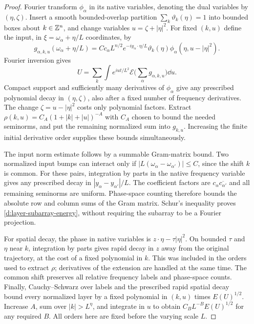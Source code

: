 \begin{proof}
Fourier transform $\phi_\alpha$ in its native variables, denoting the
dual variables by $(\eta,\zeta)$.  Insert a smooth bounded-overlap
partition $\sum_k\vartheta_k(\eta)=1$ into bounded boxes about
$k\in\mathbb Z^n$, and change variables $u=\zeta+|\eta|^2$.
For fixed $(k,u)$ define the input, in $\xi=\omega_\alpha+\eta/L$
coordinates, by
\[
 g_{\alpha,k,u}(\omega_\alpha+\eta/L)
   =C c_\alpha L^{n/2}e^{-iy_\alpha\cdot\eta/L}
       \vartheta_k(\eta)
       \widehat\phi_\alpha(\eta,u-|\eta|^2).
\]
Fourier inversion gives
\[
 U=\sum_k\int e^{iu t/L^2}
                     \mathcal E\Big(\sum_\alpha g_{\alpha,k,u}\Big)
                     \dd u.
\]
Compact support and sufficiently many derivatives of $\phi_\alpha$
give any prescribed polynomial decay in $(\eta,\zeta)$, also after a
fixed number of frequency derivatives.  The change
$\zeta=u-|\eta|^2$ costs only polynomial factors.  Extract
$\rho(k,u)=C_A(1+|k|+|u|)^{-A}$ with $C_A$ chosen to bound the needed
seminorms, and put the remaining normalized sum into $g_{k,u}$.
Increasing the finite initial derivative order supplies these bounds
simultaneously.

The input norm estimate follows by a summable Gram-matrix bound.
Two normalized input bumps can interact only if
$|L(\omega_\alpha-\omega_{\alpha'})|\le C$, since the shift $k$ is
common.  For these pairs, integration by parts in the native frequency
variable gives any prescribed decay in
$|y_\alpha-y_{\alpha'}|/L$.  The coefficient factors are
$c_\alpha\overline{c_{\alpha'}}$ and all remaining seminorms are
uniform.  Phase-space counting therefore bounds the absolute row and
column sums of the Gram matrix.  Schur's inequality proves
\eqref{d:layer-subarray-energy}, without requiring the subarray to be a
Fourier projection.

For spatial decay, the phase in native variables is
$z\cdot\eta-\tau|\eta|^2$.  On bounded $\tau$ and $\eta$ near $k$,
integration by parts gives rapid decay in $z$ away from the original
trajectory, at the cost of a fixed polynomial in $k$.  This was
included in the orders used to extract $\rho$; derivatives of the
extension are handled at the same time.  The common shift preserves
all relative frequency labels and phase-space counts.
Finally, Cauchy--Schwarz over labels and the prescribed rapid spatial
decay bound every normalized layer by a fixed polynomial in $(k,u)$
times $E(U)^{1/2}$.  Increase $A$, sum over $|k|>L^\eta$, and integrate
in $u$ to obtain $C_B L^{-B}E(U)^{1/2}$ for any required $B$.
All orders here are fixed before the varying scale $L$.
\end{proof}

